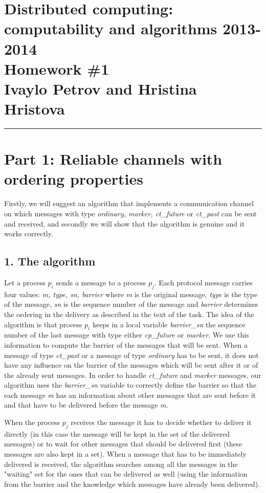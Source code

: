 \documentclass[12pt]{article}
\newcommand{\hr}{\rule{\linewidth}{0.1mm}}
\theoremstyle{plain}
\begin{document}
\section*{\centering
  Distributed computing: computability and algorithms 2013-2014 \\
  Homework \#1 \\
  Ivaylo Petrov and Hristina Hristova 
}

\hr

\section*{\textbf{Part 1: Reliable channels with ordering properties}
}

Firstly, we will suggest an algorithm that implements a communication channel 
on which messages with type \emph{ordinary, marker, ct\_future} or 
\emph{ct\_past} can be sent and received, and secondly we will show that the
algorithm is genuine and it works correctly.

\subsection*{1. The algorithm}

Let a process $p_i$ sends a message to a process $p_j$. Each protocol message
carries four values: \emph{m, type, sn, barrier} where \emph{m} is the original
message, \emph{type} is the type of the message, \emph{sn} is the sequence
number of the message and \emph{barrier} determines the ordering in the
delivery as described in the text of the task.  The idea of the algorithm is that
process $p_i$ keeps in a local variable \emph{barrier\_sn} the sequence number
of the last message with type either \emph{cp\_future} or \emph{marker}. We use
this information to compute the barrier of the messages that will be sent. When
a message of type \emph{ct\_past} or a message of type \emph{ordinary} has to
be sent, it does not have any influence on the barrier of the messages which
will be sent after it or of the already sent messages. In order to handle
\emph{ct\_future} and \emph{marker} messages, our algorithm uses the
\emph{barrier\_sn} variable to correctly define the barrier so that the each
message \emph{m} has an information about other messages that are sent before it
and that have to be delivered before the message \emph{m}.  

When the process $p_j$ receives the message it has to decide whether to
deliver it directly (in this case the message will be kept in the set of the
delivered messages) or to wait for other messages that should be delivered first
(these messages are also kept in a set). When a message that has to be
immediately delivered is received, the algorithm searches among all the messages
in the "waiting" set for the ones that can be delivered as well (using the
information from the barrier and the knowledge which messages have already been
delivered).
\end{document}
